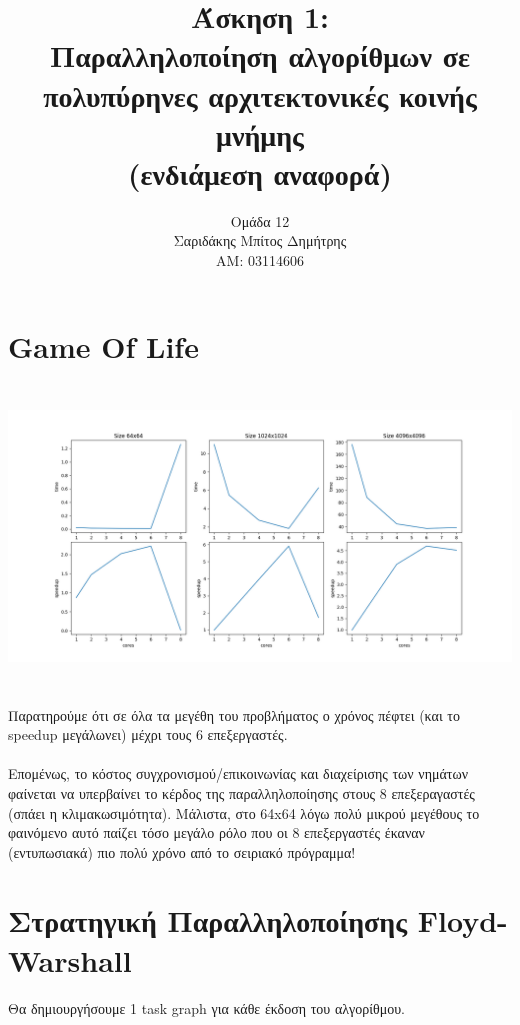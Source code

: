 \documentclass{article}
\date{}
\author{
  Ομάδα 12\\
  Σαριδάκης Μπίτος Δημήτρης\\
  ΑM: 03114606
}
\newcommand\e[1]{\foreignlanguage{english}{#1}}
\begin{document}
\title{
  \textbf{Άσκηση 1:}\\
  Παραλληλοποίηση αλγορίθμων σε πολυπύρηνες αρχιτεκτονικές
  κοινής μνήμης\\
  (ενδιάμεση αναφορά)
}
\maketitle

\newpage
\section{\e{Game Of Life}}
\centerline{\includegraphics[width=16cm, height=8cm]{../3_images/plot.png}}
Παρατηρούμε ότι σε όλα τα μεγέθη του προβλήματος ο χρόνος πέφτει (και το \e{speedup} μεγάλωνει) μέχρι τους 6 επεξεργαστές. \\\\
Επομένως, το κόστος συγχρονισμού/επικοινωνίας και διαχείρισης των νημάτων
φαίνεται να υπερβαίνει το κέρδος της παραλληλοποίησης στους 8
επεξεραγαστές (σπάει η κλιμακωσιμότητα). Μάλιστα, στο \e{64x64} λόγω πολύ μικρού μεγέθους το φαινόμενο αυτό παίζει τόσο μεγάλο ρόλο που οι 8 επεξεργαστές έκαναν (εντυπωσιακά) πιο πολύ χρόνο από το σειριακό πρόγραμμα!

\newpage
\section{Στρατηγική Παραλληλοποίησης \e{Floyd-Warshall}}
\begin{center}
  \large{Θα δημιουργήσουμε 1 \e{task graph} για κάθε έκδοση του αλγορίθμου.}
\end{center}
\end{document}
